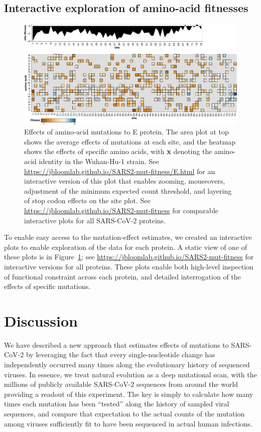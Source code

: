 \documentclass[9pt,twocolumn,twoside]{gsajnl_modified}
\begin{document}
\subsection*{Interactive exploration of amino-acid fitnesses}

\begin{figure}
\includegraphics[width=\linewidth]{figs/E_heatmap.pdf}
\caption{
Effects of amino-acid mutations to E protein.
The area plot at top shows the average effects of mutations at each site, and the heatmap shows the effects of specific amino acids, with \textbf{x} denoting the amino-acid identity in the Wuhan-Hu-1 strain.
See \url{https://jbloomlab.github.io/SARS2-mut-fitness/E.html} for an interactive version of this plot that enables zooming, mouseovers, adjustment of the minimum expected count threshold, and layering of stop codon effects on the site plot.
See \url{https://jbloomlab.github.io/SARS2-mut-fitness} for comparable interactive plots for all SARS-CoV-2 proteins.
\label{fig:E_heatmap}
}
\end{figure}

To enable easy access to the mutation-effect estimates, we created an interactive plots to enable exploration of the data for each protein.
A static view of one of these plots is in Figure~\ref{fig:E_heatmap}; see \url{https://jbloomlab.github.io/SARS2-mut-fitness} for interactive versions for all proteins.
These plots enable both high-level inspection of functional constraint across each protein, and detailed interrogation of the effects of specific mutations.

\section{Discussion}

We have described a new approach that estimates effects of mutations to SARS-CoV-2 by leveraging the fact that every single-nucleotide change has independently occurred many times along the evolutionary history of sequenced viruses.
In essence, we treat natural evolution as a deep mutational scan, with the millions of publicly available SARS-CoV-2 sequences from around the world providing a readout of this experiment.
The key is simply to calculate how many times each mutation has been ``tested'' along the history of sampled viral sequences, and compare that expectation to the actual counts of the mutation among viruses sufficiently fit to have been sequenced in actual human infections.
\end{document}
